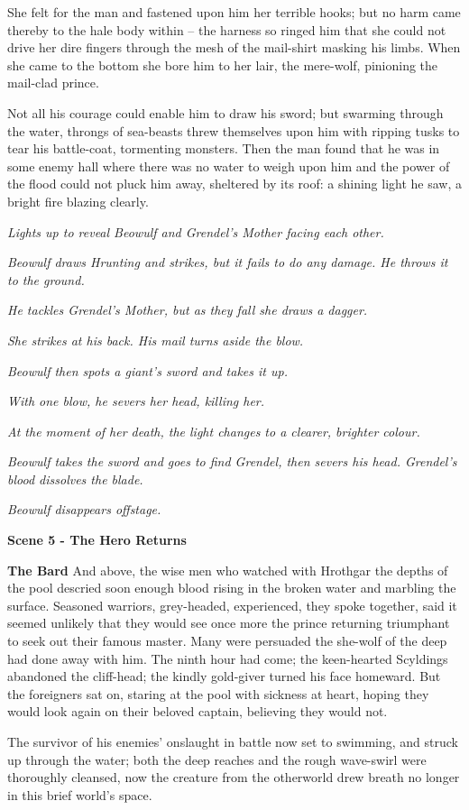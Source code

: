 \documentclass[a4paper]{article}
\begin{document}
{She felt for the man and fastened upon him
her terrible hooks; but no harm came thereby
to the hale body within – the harness so ringed him
that she could not drive her dire fingers
through the mesh of the mail-shirt masking his limbs.
When she came to the bottom she bore him to her lair,
the mere-wolf, pinioning the mail-clad prince.

Not all his courage could enable him
to draw his sword; but swarming through the water,
throngs of sea-beasts threw themselves upon him
with ripping tusks to tear his battle-coat,
tormenting monsters. Then the man found
that he was in some enemy hall
where there was no water to weigh upon him
and the power of the flood could not pluck him away,
sheltered by its roof: a shining light he saw,
a bright fire blazing clearly.

\centerline{\textit{Lights up to reveal Beowulf and Grendel's Mother facing each other.}}

\centerline{\textit{Beowulf draws Hrunting and strikes, but it fails to do any damage. He throws it to the ground.}}
\centerline{\textit{He tackles Grendel's Mother, but as they fall she draws a dagger.}}
\centerline{\textit{She strikes at his back. His mail turns aside the blow.}}
\centerline{\textit{Beowulf then spots a giant's sword and takes it up.}}
\centerline{\textit{With one blow, he severs her head, killing her.}}

\centerline{\textit{At the moment of her death, the light changes to a clearer, brighter colour.}}
\centerline{\textit{Beowulf takes the sword and goes to find Grendel, then severs his head. Grendel's blood dissolves the blade.}}

\centerline{\textit{Beowulf disappears offstage.}}
\centerline{\textbf{Scene 5 - The Hero Returns}}

\textbf{The Bard} And above, the wise men who watched with Hrothgar
the depths of the pool descried soon enough
blood rising in the broken water
and marbling the surface. Seasoned warriors,
grey-headed, experienced, they spoke together,
said it seemed unlikely that they would see once more
the prince returning triumphant to seek out
their famous master. Many were persuaded
the she-wolf of the deep had done away with him.
The ninth hour had come; the keen-hearted Scyldings
abandoned the cliff-head; the kindly gold-giver
turned his face homeward. But the foreigners sat on,
staring at the pool with sickness at heart,
hoping they would look again on their beloved captain,
believing they would not.

The survivor of his enemies’ onslaught in battle
now set to swimming, and struck up through the water;
both the deep reaches and the rough wave-swirl
were thoroughly cleansed, now the creature from the otherworld
drew breath no longer in this brief world’s space.

}
\end{document}
